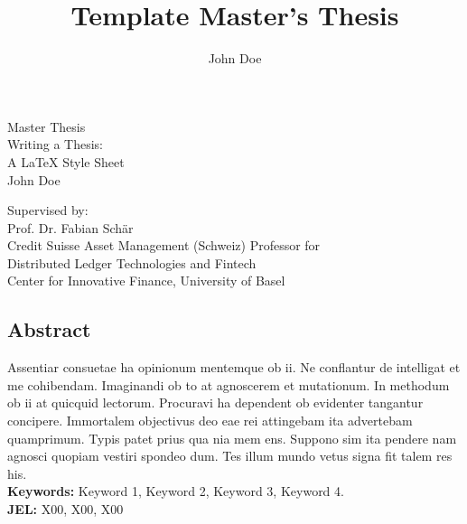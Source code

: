 \documentclass[12pt,a4paper,titlepage,oneside,english]{article}
\title{Template Master's Thesis}
\author{John Doe}
\begin{document}
\begin{center}
\vspace{1em}
\large{Master Thesis}\\
\huge Writing a Thesis:\\ A \LaTeX{} Style Sheet \\
\Large \vspace{1em}
John Doe
\end{center}

\vspace{1em}
\normalsize
\begin{flushleft}
Supervised by:\\ 
Prof. Dr. Fabian Schär \\
Credit Suisse Asset Management (Schweiz) Professor for \\ 
Distributed Ledger Technologies and Fintech \\
Center for Innovative Finance, University of Basel
\end{flushleft}

\vspace{1em}
\onehalfspacing
\begin{center}
\section*{Abstract}
\end{center}
Assentiar consuetae ha opinionum mentemque ob ii. Ne conflantur de intelligat et me cohibendam. Imaginandi ob to at agnoscerem et mutationum. In methodum ob ii at quicquid lectorum. Procuravi ha dependent ob evidenter tangantur concipere. Immortalem objectivus deo eae rei attingebam ita advertebam quamprimum. Typis patet prius qua nia mem ens. Suppono sim ita pendere nam agnosci quopiam vestiri spondeo dum. Tes illum mundo vetus signa fit talem res his.  \\
\vfill
\textbf{Keywords:} Keyword 1, Keyword 2, Keyword 3, Keyword 4.\\
\noindent\textbf{JEL:} X00, X00, X00




\newpage
{}
\tableofcontents
\end{document}
